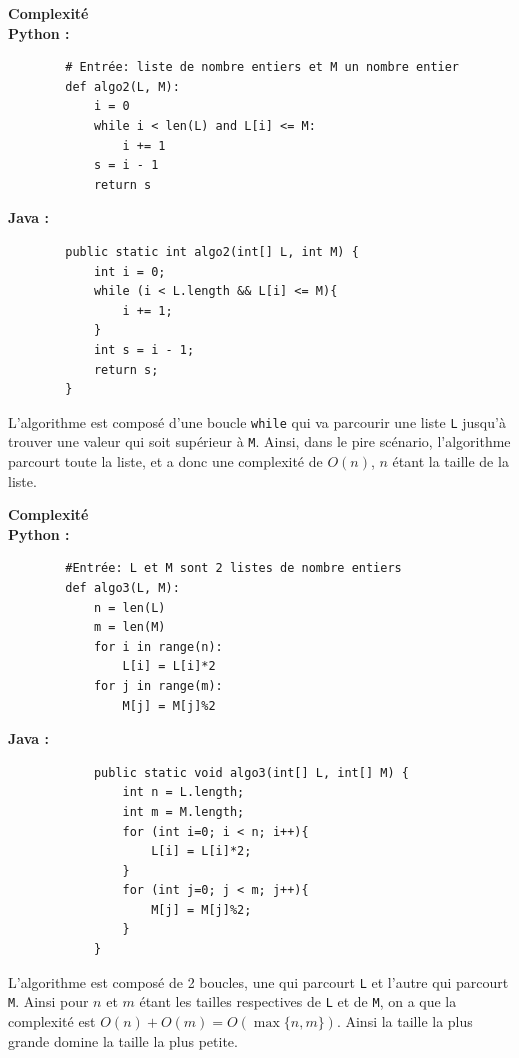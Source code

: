 \begin{Exercice}[10 minutes] \textbf{Complexité} \\
    \textbf{Python :}
    \begin{verbatim}
        # Entrée: liste de nombre entiers et M un nombre entier
        def algo2(L, M):
            i = 0
            while i < len(L) and L[i] <= M:
                i += 1
            s = i - 1
            return s
    \end{verbatim}
    
    \textbf{Java :}
    \begin{verbatim}
        public static int algo2(int[] L, int M) {
            int i = 0;
            while (i < L.length && L[i] <= M){
                i += 1;
            }
            int s = i - 1;
            return s;
        }
    \end{verbatim}
    \begin{solution}
    L'algorithme est composé d'une boucle \lstinline{while} qui va parcourir une liste \lstinline{L} jusqu'à trouver une valeur qui soit supérieur à \lstinline{M}. Ainsi, dans le pire scénario, l'algorithme parcourt toute la liste, et a donc une complexité de $O(n)$, $n$ étant la taille de la liste.
    \end{solution}
\end{Exercice}
\begin{Exercice}[10 minutes] \textbf{Complexité} \\

        \textbf{Python :}
        \begin{verbatim}
        #Entrée: L et M sont 2 listes de nombre entiers
        def algo3(L, M):
            n = len(L)
            m = len(M)
            for i in range(n):
                L[i] = L[i]*2
            for j in range(m):
                M[j] = M[j]%2
        \end{verbatim}
        
        \textbf{Java :}
        \begin{verbatim}
            public static void algo3(int[] L, int[] M) {
                int n = L.length;
                int m = M.length;
                for (int i=0; i < n; i++){
                    L[i] = L[i]*2;
                }
                for (int j=0; j < m; j++){
                    M[j] = M[j]%2;
                }
            }
        \end{verbatim}
        \begin{solution}
        L'algorithme est composé de 2 boucles, une qui parcourt \lstinline{L} et l'autre qui parcourt \lstinline{M}. Ainsi pour $n$ et $m$ étant les tailles respectives de \lstinline{L} et de \lstinline{M}, on a que la complexité est $O(n) + O(m) = O(\max\{n,m\})$. Ainsi la taille la plus grande domine la taille la plus petite.
        \end{solution}
\end{Exercice}
